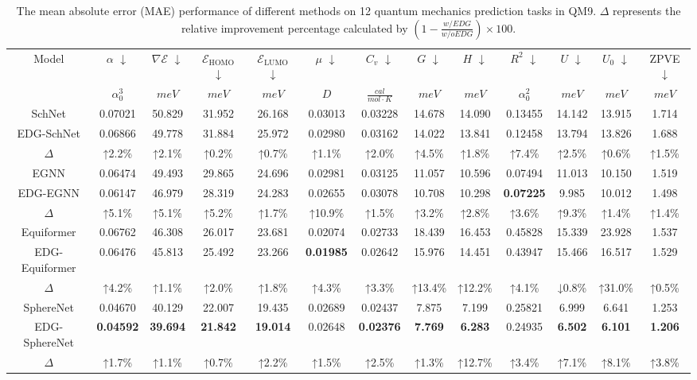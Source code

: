 \documentclass{article}
\begin{document}
\begin{table}[h]
  \scriptsize
  \centering
    \begin{tabular}{ccccccccccccc}
    \toprule
        \multirow{2}{*}{Model} & $\alpha$ $\downarrow$ & $\nabla \mathcal{E}$ $\downarrow$ & $\mathcal{E}_\text{HOMO}$ $\downarrow$ & $\mathcal{E}_\text{LUMO}$ $\downarrow$ & $\mu$ $\downarrow$ & $C_v$ $\downarrow$ & $G$ $\downarrow$ & $H$ $\downarrow$ & $R^2$ $\downarrow$ & $U$ $\downarrow$ & $U_0$ $\downarrow$ & ZPVE $\downarrow$\\
        & $\alpha_0^3$ & $meV$ & $meV$ & $meV$ & $D$ & $\frac{cal}{mol\cdot K}$ & $meV$ & $meV$ & $\alpha_0^2$ & $meV$ & $meV$ & $meV$\\
    \midrule
    SchNet & 0.07021  & 50.829  & 31.952  & 26.168  & 0.03013  & 0.03228  & 14.678  & 14.090  & 0.13455  & 14.142  & 13.915  & 1.714  \\
    EDG-SchNet & 0.06866  & 49.778  & 31.884  & 25.972  & 0.02980  & 0.03162  & 14.022  & 13.841  & 0.12458  & 13.794  & 13.826  & 1.688  \\
    $\Delta$ & ↑2.2\% & ↑2.1\% & ↑0.2\% & ↑0.7\% & ↑1.1\% & ↑2.0\% & ↑4.5\% & ↑1.8\% & ↑7.4\% & ↑2.5\% & ↑0.6\% & ↑1.5\% \\
    \midrule
    EGNN  & 0.06474  & 49.493  & 29.865  & 24.696  & 0.02981  & 0.03125  & 11.057  & 10.596  & 0.07494  & 11.013  & 10.150  & 1.519  \\
    EDG-EGNN & 0.06147  & 46.979  & 28.319  & 24.283  & 0.02655  & 0.03078  & 10.708  & 10.298  & \textbf{0.07225}  & 9.985  & 10.012  & 1.498  \\
    $\Delta$ & ↑5.1\% & ↑5.1\% & ↑5.2\% & ↑1.7\% & ↑10.9\% & ↑1.5\% & ↑3.2\% & ↑2.8\% & ↑3.6\% & ↑9.3\% & ↑1.4\% & ↑1.4\% \\
    \midrule
    Equiformer & 0.06762  & 46.308  & 26.017  & 23.681  & 0.02074  & 0.02733  & 18.439  & 16.453  & 0.45828  & 15.339  & 23.928  & 1.537  \\
    EDG-Equiformer & 0.06476  & 45.813  & 25.492  & 23.266  & \textbf{0.01985}  & 0.02642  & 15.976  & 14.451  & 0.43947  & 15.466  & 16.517  & 1.529  \\
    $\Delta$ & ↑4.2\% & ↑1.1\% & ↑2.0\% & ↑1.8\% & ↑4.3\% & ↑3.3\% & ↑13.4\% & ↑12.2\% & ↑4.1\% & ↓0.8\% & ↑31.0\% & ↑0.5\% \\
    \midrule
    SphereNet & 0.04670  & 40.129  & 22.007  & 19.435  & 0.02689  & 0.02437  & 7.875  & 7.199  & 0.25821  & 6.999  & 6.641  & 1.253  \\
    EDG-SphereNet & \textbf{0.04592}  & \textbf{39.694}  & \textbf{21.842}  & \textbf{19.014}  & 0.02648  & \textbf{0.02376}  & \textbf{7.769}  & \textbf{6.283}  & 0.24935  & \textbf{6.502}  & \textbf{6.101}  & \textbf{1.206}  \\
    $\Delta$ & ↑1.7\% & ↑1.1\% & ↑0.7\% & ↑2.2\% & ↑1.5\% & ↑2.5\% & ↑1.3\% & ↑12.7\% & ↑3.4\% & ↑7.1\% & ↑8.1\% & ↑3.8\% \\
    \bottomrule
    \end{tabular}
  \caption{The mean absolute error (MAE) performance of different methods on 12 quantum mechanics prediction tasks in QM9. $\Delta$ represents the relative improvement percentage calculated by $(1-\frac{w/ EDG}{w/o EDG})\times 100$.}
  \label{tab:qm9}
\end{table}
\end{document}
